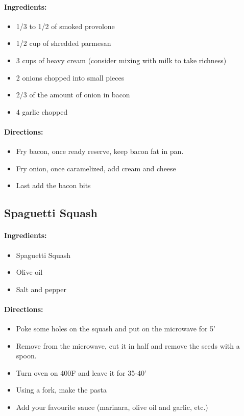 \documentclass{article}
\begin{document}
\paragraph{Ingredients:}
\begin{itemize}
    \item 1/3 to 1/2 of smoked provolone
    \item 1/2 cup of shredded parmesan
    \item 3 cups of heavy cream (consider mixing with milk to take richness)
    \item 2 onions chopped into small pieces
    \item 2/3 of the amount of onion in bacon
    \item 4 garlic chopped
\end{itemize}

\paragraph{Directions:}
\begin{itemize}
    \item Fry bacon, once ready reserve, keep bacon fat in pan.
    \item Fry onion, once caramelized, add cream and cheese
    \item Last add the bacon bits
\end{itemize}

\subsection{Spaguetti Squash}

\paragraph{Ingredients:}
\begin{itemize}
    \item Spaguetti Squash
    \item Olive oil
    \item Salt and pepper
\end{itemize}

\paragraph{Directions:}
\begin{itemize}
    \item Poke some holes on the squash and put on the microwave for 5'
    \item Remove from the microwave, cut it in half and remove the seeds with a spoon.
    \item Turn oven on 400F and leave it for 35-40'
    \item Using a fork, make the pasta
    \item Add your favourite sauce (marinara, olive oil and garlic, etc.)
\end{itemize}
\end{document}
